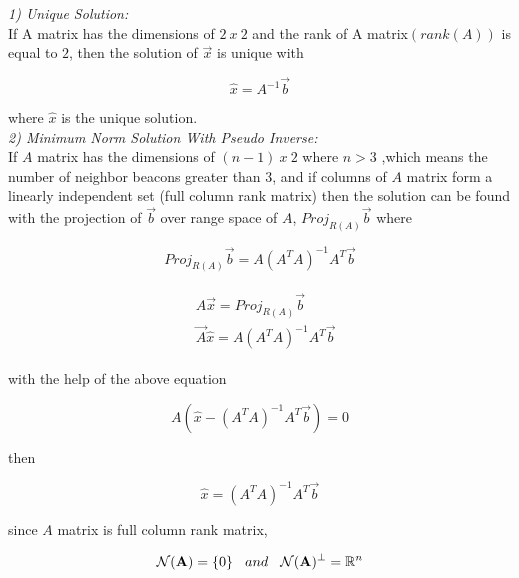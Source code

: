 \textit{1) Unique Solution:}\\
 If A matrix has the dimensions of $2\ x\ 2$ and the rank of A matrix$(rank(A))$ is equal to $2$, then the solution of $\vec{x}$ is unique with

\begin{equation}
\hat{x} = A^{-1}\vec{b}
\end{equation}

where $\hat{x}$ is the unique solution. \\
  
\textit{ 2) Minimum Norm Solution With Pseudo Inverse:} \\  
If $A$ matrix has the dimensions of $(n-1)\ x\ 2$ where $n>3$ ,which means the number of neighbor beacons greater than $3$, and if columns of $A$ matrix form a linearly independent set (full column rank matrix) then the solution can be found with the projection of $\vec{b}$ over range space of $A$, $Proj_{R(A)}\vec{b}$ where

\begin{equation}
Proj_{R(A)}\vec{b} = A (A^TA)^{-1}A^T\vec{b}
\end{equation}

\begin{align}
\begin{split}
& A\vec{x} = Proj_{R(A)}\vec{b}\\
& \vec{A}\hat{x} = A(A^TA)^{-1}A^T\vec{b}
\end{split}
\end{align}
 
with the help of the above equation

\begin{equation}
 A(\hat{x} - (A^TA)^{-1}A^T\vec{b}) = 0
\end{equation}

then 

\begin{equation}
\hat{x} = (A^TA)^{-1}A^T\vec{b}
\end{equation}
  
since $A$ matrix is full column rank matrix,

\begin{align}
\begin{split}
\mathcal{N}(\mathbf{A}) = \{0\} \hspace{0.3cm}  and  \hspace{0.3cm}  \mathcal{N}(\mathbf{A})^\perp =\mathbb{R} ^n 
\end{split}
\end{align}
  
